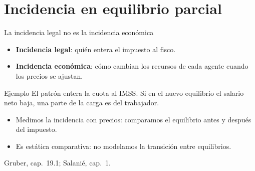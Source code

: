 \documentclass[aspectratio=169,11pt]{beamer}
\newcommand{\fuente}[1]{\par\vfill{\small\color{cGris}#1\par}}
\begin{document}
\section{Incidencia en equilibrio parcial}

\begin{frame}{La incidencia legal no es la incidencia económica}
  \begin{itemize}
    \item \textbf{Incidencia legal}: quién entera el impuesto al fisco.
    \item \textbf{Incidencia económica}: cómo cambian los recursos de cada agente cuando los precios se ajustan.
  \end{itemize}
  \pause
  \begin{block}{Ejemplo}
    El patrón entera la cuota al IMSS. Si en el nuevo equilibrio el salario neto baja, una parte de la carga es del trabajador.
  \end{block}
  \pause
  \begin{itemize}
    \item Medimos la incidencia con precios: comparamos el equilibrio antes y después del impuesto.
    \item Es estática comparativa: no modelamos la transición entre equilibrios.
  \end{itemize}
  \fuente{Gruber, cap.~19.1; Salanié, cap.~1.}
\end{frame}
\end{document}
